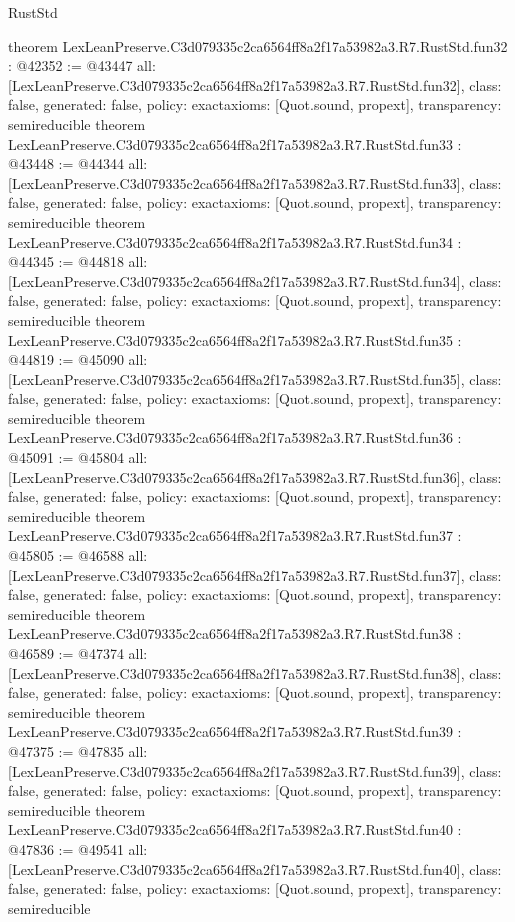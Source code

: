 \begin{lexlean}{RustStd}
\begin{coremodule}
{}
theorem LexLeanPreserve.C3d079335c2ca6564ff8a2f17a53982a3.R7.RustStd.fun32 : @42352 := @43447 {
  all: [LexLeanPreserve.C3d079335c2ca6564ff8a2f17a53982a3.R7.RustStd.fun32],
  class: false,
  generated: false,
  policy: exact{axioms: [Quot.sound, propext]},
  transparency: semireducible
}
theorem LexLeanPreserve.C3d079335c2ca6564ff8a2f17a53982a3.R7.RustStd.fun33 : @43448 := @44344 {
  all: [LexLeanPreserve.C3d079335c2ca6564ff8a2f17a53982a3.R7.RustStd.fun33],
  class: false,
  generated: false,
  policy: exact{axioms: [Quot.sound, propext]},
  transparency: semireducible
}
theorem LexLeanPreserve.C3d079335c2ca6564ff8a2f17a53982a3.R7.RustStd.fun34 : @44345 := @44818 {
  all: [LexLeanPreserve.C3d079335c2ca6564ff8a2f17a53982a3.R7.RustStd.fun34],
  class: false,
  generated: false,
  policy: exact{axioms: [Quot.sound, propext]},
  transparency: semireducible
}
theorem LexLeanPreserve.C3d079335c2ca6564ff8a2f17a53982a3.R7.RustStd.fun35 : @44819 := @45090 {
  all: [LexLeanPreserve.C3d079335c2ca6564ff8a2f17a53982a3.R7.RustStd.fun35],
  class: false,
  generated: false,
  policy: exact{axioms: [Quot.sound, propext]},
  transparency: semireducible
}
theorem LexLeanPreserve.C3d079335c2ca6564ff8a2f17a53982a3.R7.RustStd.fun36 : @45091 := @45804 {
  all: [LexLeanPreserve.C3d079335c2ca6564ff8a2f17a53982a3.R7.RustStd.fun36],
  class: false,
  generated: false,
  policy: exact{axioms: [Quot.sound, propext]},
  transparency: semireducible
}
theorem LexLeanPreserve.C3d079335c2ca6564ff8a2f17a53982a3.R7.RustStd.fun37 : @45805 := @46588 {
  all: [LexLeanPreserve.C3d079335c2ca6564ff8a2f17a53982a3.R7.RustStd.fun37],
  class: false,
  generated: false,
  policy: exact{axioms: [Quot.sound, propext]},
  transparency: semireducible
}
theorem LexLeanPreserve.C3d079335c2ca6564ff8a2f17a53982a3.R7.RustStd.fun38 : @46589 := @47374 {
  all: [LexLeanPreserve.C3d079335c2ca6564ff8a2f17a53982a3.R7.RustStd.fun38],
  class: false,
  generated: false,
  policy: exact{axioms: [Quot.sound, propext]},
  transparency: semireducible
}
theorem LexLeanPreserve.C3d079335c2ca6564ff8a2f17a53982a3.R7.RustStd.fun39 : @47375 := @47835 {
  all: [LexLeanPreserve.C3d079335c2ca6564ff8a2f17a53982a3.R7.RustStd.fun39],
  class: false,
  generated: false,
  policy: exact{axioms: [Quot.sound, propext]},
  transparency: semireducible
}
theorem LexLeanPreserve.C3d079335c2ca6564ff8a2f17a53982a3.R7.RustStd.fun40 : @47836 := @49541 {
  all: [LexLeanPreserve.C3d079335c2ca6564ff8a2f17a53982a3.R7.RustStd.fun40],
  class: false,
  generated: false,
  policy: exact{axioms: [Quot.sound, propext]},
  transparency: semireducible
}
\end{coremodule}
\end{lexlean}
